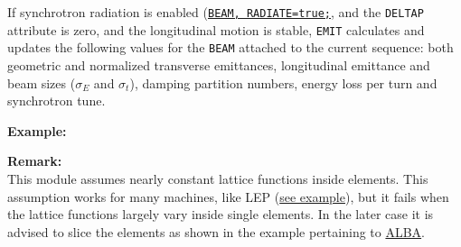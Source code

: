 If synchrotron radiation is enabled (\hyperref[sec:beam]{\tt BEAM, RADIATE=true;}, 
and the {\tt DELTAP} attribute is zero, and the longitudinal motion is stable, 
{\tt EMIT} calculates and updates the following values for the {\tt BEAM} attached 
to the current sequence: both geometric and normalized transverse emittances, 
longitudinal emittance and beam sizes ($\sigma_E$ and $\sigma_t$), 
damping partition numbers, energy loss per turn and synchrotron tune.


{\bf Example:}

{\bf Remark:}\\
This module assumes nearly constant lattice functions
inside elements. This assumption works for many machines, like LEP
(\href{http://cern.ch/frs/mad-X_examples/emit/LEP/}{see example}), but
it fails when the lattice functions largely vary inside single
elements. In the later case it is advised to slice the elements as shown
in the example pertaining to
\href{http://cern.ch/frs/mad-X_examples/emit/ALBA/}{ALBA}.     


